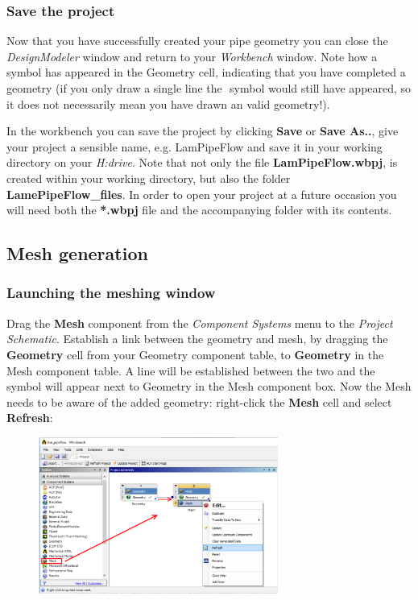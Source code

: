 \documentclass[11pt,a4paper,oneside]{scrartcl}
\newcommand\bfr[1]{\textcolor[rgb]{1,0.00,0.00}{\textbf{\textsf{#1}}}}
\newcommand\cm{\textcolor[rgb]{0.00,0.50,0.00}{\checkmark}\,\,}
\begin{document}
\subsubsection{Save the project}
Now that you have successfully created your pipe geometry you can close the \emph{DesignModeler} window and return to your \emph{Workbench} window. Note how a \cm  symbol has appeared in the Geometry cell, indicating that you have completed a geometry (if you only draw a single line the \cm  symbol would still have appeared, so it does not necessarily mean you have drawn an valid geometry!).

In the workbench you can save the project by clicking \bfr{Save} or \bfr{Save As..}, give your project a sensible name, e.g. LamPipeFlow and save it in your working directory on your \emph{H:drive}. Note that not only the file \bfr{LamPipeFlow.wbpj}, is created within your working directory, but also the folder \bfr{LamePipeFlow\_files}. In order to open your project at a future occasion you will need both the \bfr{*.wbpj} file and the accompanying folder with its contents.

\subsection{Mesh generation}

\subsubsection{Launching the meshing window}

Drag the \bfr{Mesh} component from the \emph{Component Systems} menu to the \emph{Project Schematic}. Establish a link between the geometry and mesh, by dragging the \bfr{Geometry} cell from your Geometry component table, to \bfr{Geometry} in the Mesh component table. A line will be established between the two and the \cm symbol will appear next to Geometry in the Mesh component box. Now the Mesh needs to be aware of the added geometry: right-click the \bfr{Mesh} cell and select \bfr{Refresh}:

\begin{figure}[H]
\begin{center}
\includegraphics[width=0.7\textwidth,clip]{Mesh_workbench.png}
\end{center}
\end{figure}
\end{document}
